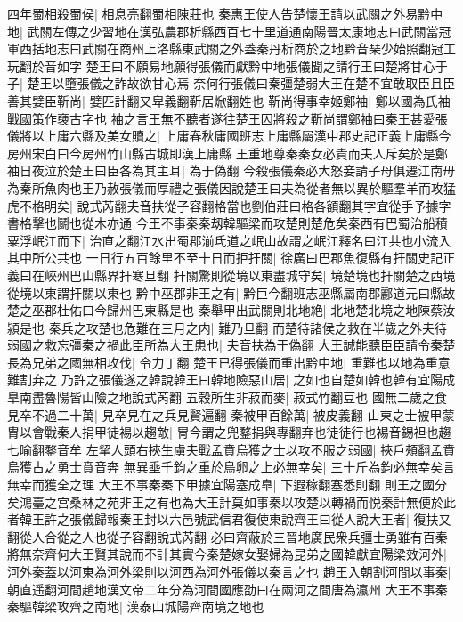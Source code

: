 四年蜀相殺蜀侯|{
	相息亮翻蜀相陳莊也
	}
秦惠王使人告楚懷王請以武關之外易黔中地|{
	武關左傳之少習地在漢弘農郡析縣西百七十里道通南陽晉太康地志曰武關當冠軍西括地志曰武關在商州上洛縣東武關之外蓋秦丹析商於之地黔音琹少始照翻冠工玩翻於音如字
	}
楚王曰不願易地願得張儀而獻黔中地張儀聞之請行王曰楚將甘心于子|{
	楚王以墮張儀之詐故欲甘心焉
	}
奈何行張儀曰秦彊楚弱大王在楚不宜敢取臣且臣善其嬖臣靳尚|{
	嬖匹計翻又卑義翻靳居焮翻姓也
	}
靳尚得事幸姬鄭袖|{
	鄭以國為氏袖戰國策作褏古字也
	}
袖之言王無不聽者遂往楚王囚將殺之靳尚謂鄭袖曰秦王甚愛張儀將以上庸六縣及美女贖之|{
	上庸春秋庸國班志上庸縣屬漢中郡史記正義上庸縣今房州宋白曰今房州竹山縣古城即漢上庸縣
	}
王重地尊秦秦女必貴而夫人斥矣於是鄭袖日夜泣於楚王曰臣各為其主耳|{
	為于偽翻
	}
今殺張儀秦必大怒妾請子母俱遷江南毋為秦所魚肉也王乃赦張儀而厚禮之張儀因說楚王曰夫為從者無以異於驅羣羊而攻猛虎不格明矣|{
	說式芮翻夫音扶從子容翻格當也劉伯莊曰格各額翻其字宜從手予據字書格擊也鬬也從木亦通
	}
今王不事秦秦刼韓驅梁而攻楚則楚危矣秦西有巴蜀治船積粟浮岷江而下|{
	治直之翻江水出蜀郡湔氐道之岷山故謂之岷江釋名曰江共也小流入其中所公共也
	}
一日行五百餘里不至十日而拒扞關|{
	徐廣曰巴郡魚復縣有扞關史記正義曰在峽州巴山縣界扞寒旦翻
	}
扞關驚則從境以東盡城守矣|{
	境楚境也扞關楚之西境從境以東謂扞關以東也
	}
黔中巫郡非王之有|{
	黔巨今翻班志巫縣屬南郡酈道元曰縣故楚之巫郡杜佑曰今歸州巴東縣是也
	}
秦舉甲出武關則北地絶|{
	北地楚北境之地陳蔡汝潁是也
	}
秦兵之攻楚也危難在三月之内|{
	難乃旦翻
	}
而楚待諸侯之救在半歲之外夫待弱國之救忘彊秦之禍此臣所為大王患也|{
	夫音扶為于偽翻
	}
大王誠能聽臣臣請令秦楚長為兄弟之國無相攻伐|{
	令力丁翻
	}
楚王已得張儀而重出黔中地|{
	重難也以地為重意難割弃之
	}
乃許之張儀遂之韓說韓王曰韓地險惡山居|{
	之如也自楚如韓也韓有宜陽成臯南盡魯陽皆山險之地說式芮翻
	}
五穀所生非菽而麥|{
	菽式竹翻豆也
	}
國無二歲之食見卒不過二十萬|{
	見卒見在之兵見賢遍翻
	}
秦被甲百餘萬|{
	被皮義翻
	}
山東之士被甲蒙胄以會戰秦人捐甲徒裼以趨敵|{
	冑今謂之兜鍪捐與專翻弃也徒徒行也裼音錫袒也趨七喻翻鍪音牟
	}
左挈人頭右挾生虜夫戰孟賁烏獲之士以攻不服之弱國|{
	挾戶頰翻孟賁烏獲古之勇士賁音奔
	}
無異埀千鈞之重於鳥卵之上必無幸矣|{
	三十斤為鈞必無幸矣言無幸而獲全之理
	}
大王不事秦秦下甲據宜陽塞成臯|{
	下遐稼翻塞悉則翻
	}
則王之國分矣鴻臺之宫桑林之苑非王之有也為大王計莫如事秦以攻楚以轉禍而悦秦計無便於此者韓王許之張儀歸報秦王封以六邑號武信君復使東說齊王曰從人說大王者|{
	復扶又翻從人合從之人也從子容翻說式芮翻
	}
必曰齊蔽於三晉地廣民衆兵彊士勇雖有百秦將無奈齊何大王賢其說而不計其實今秦楚嫁女娶婦為昆弟之國韓獻宜陽梁效河外|{
	河外秦蓋以河東為河外梁則以河西為河外張儀以秦言之也
	}
趙王入朝割河間以事秦|{
	朝直遥翻河間趙地漢文帝二年分為河間國應劭曰在兩河之間唐為瀛州
	}
大王不事秦秦驅韓梁攻齊之南地|{
	漢泰山城陽齊南境之地也
	}

